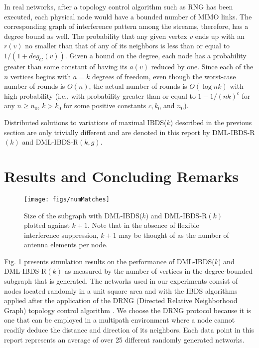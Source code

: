 \documentclass[journal,12pt,onecolumn]{IEEEtran}
\begin{document}
In real networks, after a topology control algorithm such as RNG has
been executed, each physical node would have a bounded number of MIMO
links. The corresponding graph of interference pattern among the
streams, therefore, has a degree bound as well. The probability that any
given vertex $v$ ends up with an $r(v)$ no smaller than that of
any of its neighbors is less than or equal to $1/(1+deg_G(v))$. Given
a bound on the degree, each node has a probability greater than some
constant of having its $a(v)$ reduced by one. Since each of the $n$
vertices begins with $a=k$ degrees of freedom, even though the worst-case
number of rounds is $O(n)$, the actual number of rounds is $O(\log
nk)$ with high probability (i.e., with probability greater than or
equal to $1 - 1/(nk)^c$ for any $n \geq n_0$, $k > k_0$ for some positive
constants $c, k_0$ and $n_0$). 

Distributed solutions to variations of
maximal IBDS($k$) described in the previous section are only
trivially different and are denoted in this report
by DML-IBDS-R$(k)$ and DML-IBDS-R$(k,g)$.

\section{Results and Concluding Remarks}
\label{sec:results}

\begin{figure}[!t]
\begin{center}
\texttt{[image: figs/numMatches]}
\caption{Size of the subgraph with DML-IBDS($k$) and
  DML-IBDS-R$(k)$ plotted against $k+1$. Note that in the 
  absence of flexible interference suppression, $k+1$ may be thought
  of as the number of antenna elements per node.} 
\label{fig:numMatches}
\end{center}
\end{figure}

Fig.\,\,\ref{fig:numMatches} presents simulation results on the performance of
DML-IBDS($k$) and DML-IBDS-R$(k)$ as measured by the number of
vertices in the degree-bounded subgraph that is generated. The networks used in 
our experiments consist of nodes located randomly in a unit square
area and with the IBDS algorithms applied after the application of the
DRNG (Directed Relative Neighborhood Graph) topology control algorithm
\cite{LiHou2005-1313}. We choose the DRNG protocol because it is one
that can be employed in a multipath environment where a node cannot
readily deduce the distance and direction of its neighbors. Each data
point in this report represents an average of over 25 different
randomly generated networks.
\end{document}
